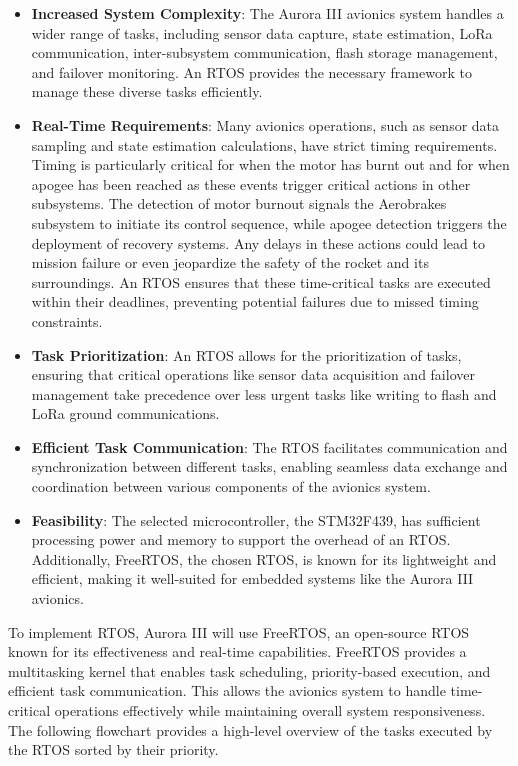 \begin{itemize}
  \item \textbf{Increased System Complexity}: The Aurora III avionics system handles a wider range of tasks, including sensor data capture, state estimation, LoRa communication, inter-subsystem communication, flash storage management, and failover monitoring. An RTOS provides the necessary framework to manage these diverse tasks efficiently. 
  \item \textbf{Real-Time Requirements}: Many avionics operations, such as sensor data sampling and state estimation calculations, have strict timing requirements. Timing is particularly critical for when the motor has burnt out and for when apogee has been reached as these events trigger critical actions in other subsystems. The detection of motor burnout signals the Aerobrakes subsystem to initiate its control sequence, while apogee detection triggers the deployment of recovery systems. Any delays in these actions could lead to mission failure or even jeopardize the safety of the rocket and its surroundings. An RTOS ensures that these time-critical tasks are executed within their deadlines, preventing potential failures due to missed timing constraints. 
  \item \textbf{Task Prioritization}: An RTOS allows for the prioritization of tasks, ensuring that critical operations like sensor data acquisition and failover management take precedence over less urgent tasks like writing to flash and LoRa ground communications. 
  \item \textbf{Efficient Task Communication}: The RTOS facilitates communication and synchronization between different tasks, enabling seamless data exchange and coordination between various components of the avionics system. 
  \item \textbf{Feasibility}: The selected microcontroller, the STM32F439, has sufficient processing power and memory to support the overhead of an RTOS. Additionally, FreeRTOS, the chosen RTOS, is known for its lightweight and efficient, making it well-suited for embedded systems like the Aurora III avionics. 
\end{itemize}

To implement RTOS, Aurora III will use FreeRTOS, an open-source RTOS known for its effectiveness and real-time capabilities. FreeRTOS provides a multitasking kernel that enables task scheduling, priority-based execution, and efficient task communication. This allows the avionics system to handle time-critical operations effectively while maintaining overall system responsiveness. The following flowchart provides a high-level overview of the tasks executed by the RTOS sorted by their priority. 

